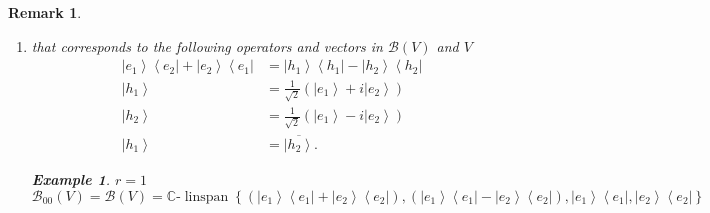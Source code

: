 \documentclass[aps,preprint]{revtex4}%
\newtheorem{example}[theorem]{Example}
\newtheorem{remark}[theorem]{Remark}
\begin{document}
\begin{remark}
\begin{enumerate}
\item that corresponds to the following operators and vectors in
$\mathcal{B}\left(  V\right)  $ and $V$%
\begin{align}
\left\vert e_{1}\right\rangle \left\langle e_{2}\right\vert +\left\vert
e_{2}\right\rangle \left\langle e_{1}\right\vert  &  =\left\vert
h_{1}\right\rangle \left\langle h_{1}\right\vert -\left\vert h_{2}%
\right\rangle \left\langle h_{2}\right\vert \\
\left\vert h_{1}\right\rangle  &  =\frac{1}{\sqrt{2}}\left(  \left\vert
e_{1}\right\rangle +i\left\vert e_{2}\right\rangle \right) \\
\left\vert h_{2}\right\rangle  &  =\frac{1}{\sqrt{2}}\left(  \left\vert
e_{1}\right\rangle -i\left\vert e_{2}\right\rangle \right) \\
\left\vert h_{1}\right\rangle  &  =\overline{\left\vert h_{2}\right\rangle }.
\end{align}


\begin{example}
$r=1$%
\begin{equation}
\mathcal{B}_{00}\left(  V\right)  =\mathcal{B}\left(  V\right)  =\mathbb{C}%
\text{-}\operatorname*{linspan}\left\{  \left(  \left\vert e_{1}\right\rangle
\left\langle e_{1}\right\vert +\left\vert e_{2}\right\rangle \left\langle
e_{2}\right\vert \right)  ,\left(  \left\vert e_{1}\right\rangle \left\langle
e_{1}\right\vert -\left\vert e_{2}\right\rangle \left\langle e_{2}\right\vert
\right)  ,\left\vert e_{1}\right\rangle \left\langle e_{1}\right\vert
,\left\vert e_{2}\right\rangle \left\langle e_{2}\right\vert \right\}
\end{equation}



\end{example}
\end{enumerate}
\end{remark}
\end{document}
